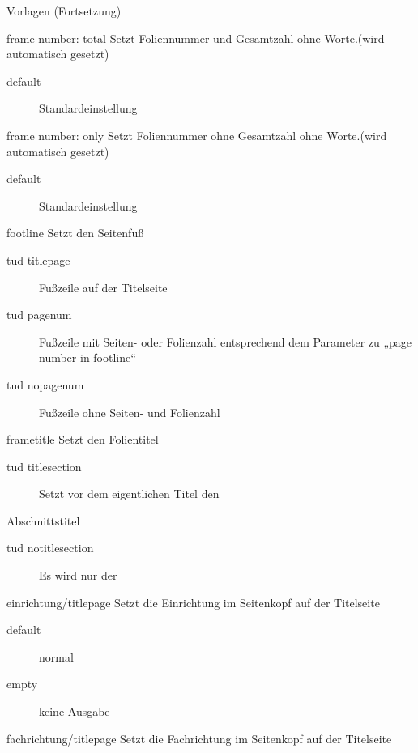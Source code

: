 \documentclass[presentation,t]{beamer}
\begin{document}
\begin{frame}[label=sec-2-2-5]{Vorlagen (Fortsetzung)}
\begin{block}{frame number: total}
Setzt Foliennummer und Gesamtzahl ohne Worte.(wird automatisch gesetzt)
\begin{description}
\item[{default}] Standardeinstellung
\end{description}
\end{block}

\begin{block}{frame number: only}
Setzt Foliennummer ohne  Gesamtzahl ohne Worte.(wird automatisch gesetzt)
\begin{description}
\item[{default}] Standardeinstellung
\end{description}
\end{block}


\begin{block}{footline}
Setzt den Seitenfuß

\begin{description}
\item[{tud titlepage}] Fußzeile auf der Titelseite
\item[{tud pagenum}] Fußzeile mit Seiten- oder Folienzahl entsprechend dem
Parameter zu „page number in footline“
\item[{tud nopagenum}] Fußzeile ohne Seiten- und Folienzahl
\end{description}
\end{block}

\begin{block}{frametitle}
Setzt den Folientitel
\begin{description}
\item[{tud titlesection}] Setzt vor dem eigentlichen Titel den
\end{description}
Abschnittstitel
\begin{description}
\item[{tud notitlesection}] Es wird nur der
\end{description}
\end{block}

\begin{block}{einrichtung/titlepage}
Setzt die Einrichtung im Seitenkopf auf der Titelseite

\begin{description}
\item[{default}] normal
\item[{empty}] keine Ausgabe
\end{description}
\end{block}
\begin{block}{fachrichtung/titlepage}
Setzt die Fachrichtung im Seitenkopf auf der Titelseite


\end{block}
\end{frame}
\end{document}
